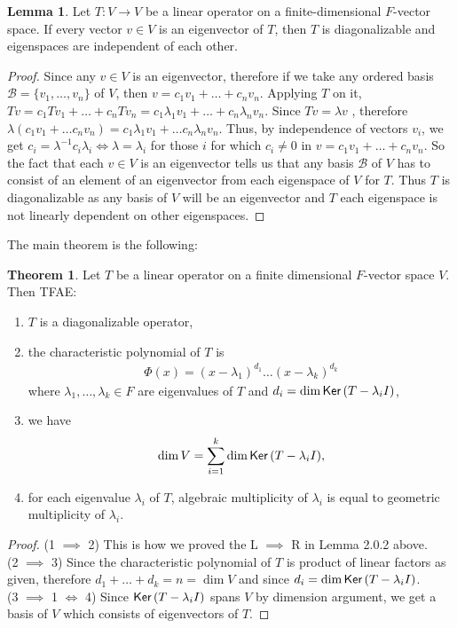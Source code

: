 \documentclass[letterpaper,11pt,twoside]{article}
\theoremstyle{definition}
\theoremstyle{definition}
\newtheorem{theorem}[proposition]{Theorem}
\theoremstyle{definition}
\theoremstyle{definition}
\newtheorem{lemma}[proposition]{\textbf{Lemma}}
\theoremstyle{definition}
\theoremstyle{definition}
\theoremstyle{remark}
\theoremstyle{definition}
\newcommand{\Ker}[1]{{\fontfamily{lmss}\selectfont 
		\text{Ker}\left (#1\right )
}}
\begin{document}
    \begin{lemma}
    Let $T : V\to V$ be a linear operator on a finite-dimensional $F$-vector space. If every vector $v\in V$ is an eigenvector of $T$, then $T$ is diagonalizable and eigenspaces are independent of each other.
    \end{lemma}
    \begin{proof}
    Since any $v\in V$ is an eigenvector, therefore if we take any ordered basis $\mathcal{B} = \{v_1,\dots,v_n\}$ of $V$, then $v = c_1v_1 + \dots + c_nv_n$. Applying $T$ on it, $Tv = c_1Tv_1 + \dots + c_nTv_n = c_1\lambda_1 v_1 + \dots + c_n\lambda_n v_n$. Since $Tv = \lambda v$ , therefore $\lambda (c_1v_1 + \dots c_n v_n ) = c_1 \lambda_1 v_1 + \dots c_n \lambda_n v_n$. Thus, by independence of vectors $v_i$, we get $c_i = \lambda^{-1} c_i \lambda_i \iff  \lambda = \lambda_i$ for those $i$ for which $c_i \neq 0$ in $v = c_1v_1 + \dots + c_n v_n$. So the fact that each $v\in V$ is an eigenvector tells us that any basis $\mathcal{B}$ of $V$ has to  consist of an element of an eigenvector from each eigenspace of $V$ for $T$. Thus $T$ is diagonalizable as any basis of $V$ will be an eigenvector and $T$ each eigenspace is not linearly dependent on other eigenspaces.
    \end{proof}
    The main theorem is the following:
    \begin{theorem}\label{T-2.0.4}
        Let $T$ be a linear operator on a finite dimensional $F$-vector space $V$. Then TFAE:
        \begin{enumerate}
            \item {$T$ is a diagonalizable operator,}
            \item {the characteristic polynomial of $T$ is
            \begin{align*}
                \Phi(x) = (x-\lambda_1)^{d_1} \dots (x-\lambda_k)^{d_k}
            \end{align*}
            where $\lambda_1,\dots,\lambda_k \in F$ are eigenvalues of $T$ and $d_i = \dim \Ker{T-\lambda_i I}$,
            }
            \item{we have
            \begin{align*}
                \dim V = \sum_{i=1}^k \dim\Ker{T-\lambda_iI},
            \end{align*}
            }
            \item {for each eigenvalue $\lambda_i $ of $T$, algebraic multiplicity of $\lambda_i $ is equal to geometric multiplicity of $\lambda_i$.}
        \end{enumerate}
    \end{theorem}
    \begin{proof}
    (1 $\implies$ 2) This is how we proved the L $\implies$ R in Lemma 2.0.2 above. \\
    (2 $\implies$ 3) Since the characteristic polynomial of $T$ is product of linear factors as given, therefore $d_1 + \dots + d_k = n = \dim V$ and since $d_i = \dim \Ker{T-\lambda_i I}$. \\
    (3 $\implies$ 1 $\iff$ 4) Since $\Ker{T-\lambda_i I}$ spans $V$ by dimension argument, we get a basis of $V$ which consists of eigenvectors of $T$.
    \end{proof}
    
\end{document}
